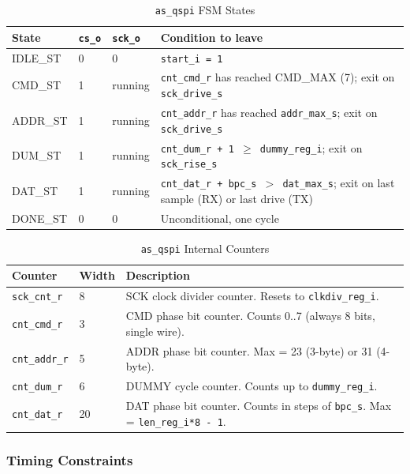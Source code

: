 \begin{table}[H]
\caption{\texttt{as\_qspi} FSM States}
\label{tab:asqspi_fsm}
\centering
\begin{tabularx}{\textwidth}{|l|l|l|X|}
  \hline
  State & \texttt{cs\_o} & \texttt{sck\_o} & Condition to leave \\
  \hline\hline
  IDLE\_ST  & 0 & 0 & \texttt{start\_i = 1} \\
  \hline
  CMD\_ST   & 1 & running & \texttt{cnt\_cmd\_r} has reached CMD\_MAX (7); exit on \texttt{sck\_drive\_s} \\
  \hline
  ADDR\_ST  & 1 & running & \texttt{cnt\_addr\_r} has reached \texttt{addr\_max\_s}; exit on \texttt{sck\_drive\_s} \\
  \hline
  DUM\_ST   & 1 & running & \texttt{cnt\_dum\_r + 1 $\geq$ dummy\_reg\_i}; exit on \texttt{sck\_rise\_s} \\
  \hline
  DAT\_ST   & 1 & running & \texttt{cnt\_dat\_r + bpc\_s $>$ dat\_max\_s}; exit on last sample (RX) or last drive (TX) \\
  \hline
  DONE\_ST  & 0 & 0 & Unconditional, one cycle \\
  \hline
\end{tabularx}
\end{table}

\begin{table}[H]
\caption{\texttt{as\_qspi} Internal Counters}
\label{tab:asqspi_cnt}
\centering
\begin{tabularx}{\textwidth}{|l|l|X|}
  \hline
  Counter & Width & Description \\
  \hline\hline
  \texttt{sck\_cnt\_r}  & 8 & SCK clock divider counter. Resets to \texttt{clkdiv\_reg\_i}. \\
  \hline
  \texttt{cnt\_cmd\_r}  & 3 & CMD phase bit counter. Counts 0..7 (always 8 bits, single wire). \\
  \hline
  \texttt{cnt\_addr\_r} & 5 & ADDR phase bit counter. Max = 23 (3-byte) or 31 (4-byte). \\
  \hline
  \texttt{cnt\_dum\_r}  & 6 & DUMMY cycle counter. Counts up to \texttt{dummy\_reg\_i}. \\
  \hline
  \texttt{cnt\_dat\_r}  & 20 & DAT phase bit counter. Counts in steps of \texttt{bpc\_s}. Max = \texttt{len\_reg\_i*8 - 1}. \\
  \hline
\end{tabularx}
\end{table}

\subsubsection{Timing Constraints}

